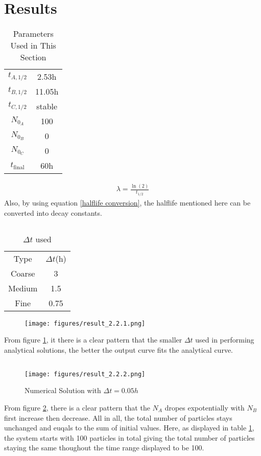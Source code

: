 \documentclass{article}
\begin{document}
\section{Results}

\begin{table}[h]
    \centering
    \caption{Parameters Used in This Section} \label{parameters}
    \begin{tabular}{c c}
        \hline
        \(t_{A,1/2}\)&2.53h\\
        \(t_{B,1/2}\)&11.05h\\
        \(t_{C,1/2}\)&stable\\
        \(N_{0_A}\)&100\\
        \(N_{0_B}\)&0\\
        \(N_{0_C}\)&0\\
        \(t_{\text{final}}\)&60h\\
        \hline        
    \end{tabular}
\end{table}
\begin{align}
    \lambda = \frac{\ln (2)}{t_{1/2}}\label{halflife conversion}
\end{align}
Also, by using equation \ref{halflife conversion}, the halflife mentioned here can be converted into decay constants.


\subsection{}


\begin{table*}[h]
    \centering
    \caption*{$\Delta t$ used}
\begin{tabular}{c c}
    \hline 
    Type& \(\Delta t\)(h)\\
    Coarse& 3\\
    Medium& 1.5\\
    Fine& 0.75\\ \hline
\end{tabular}

\end{table*}
\begin{figure}[h]
    \centering
    \texttt{[image: figures/result\_2.2.1.png]}
    \caption{} \label{1}
\end{figure}
From figure \ref{1}, it there is a clear pattern that the smaller \(\Delta t\) used in performing analytical solutions, the better the output curve fits the analytical curve.
\newpage
\subsection{}
\begin{figure}[h]
    \centering
    \texttt{[image: figures/result\_2.2.2.png]}
    \caption{Numerical Solution with \(\Delta t = 0.05 h\)} \label{2}
\end{figure}
From figure \ref{2}, there is a clear pattern that the \(N_A\) dropes expotentially with \(N_B\) first increase  then decrease. All in all, the total number of particles stays unchanged and euqals to the sum of initial
values. Here, as displayed in table \ref{parameters}, the system starts with 100 particles in total giving the total number of particles staying the same 
thoughout the time range displayed to be 100.
\end{document}
